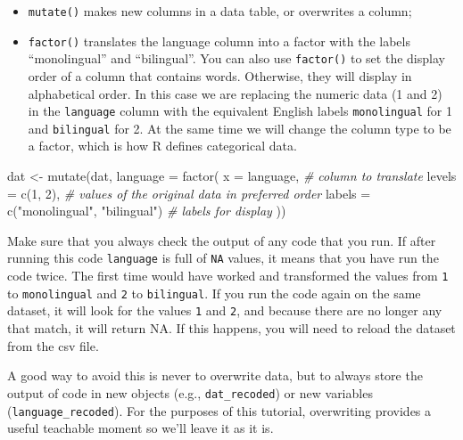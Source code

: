 \documentclass[
  english,
  doc,floatsintext]{apa6}
\newenvironment{Shaded}{\begin{snugshade}}{\end{snugshade}}
\newcommand{\AttributeTok}[1]{\textcolor[rgb]{0.77,0.63,0.00}{#1}}
\newcommand{\CommentTok}[1]{\textcolor[rgb]{0.56,0.35,0.01}{\textit{#1}}}
\newcommand{\DecValTok}[1]{\textcolor[rgb]{0.00,0.00,0.81}{#1}}
\newcommand{\FunctionTok}[1]{\textcolor[rgb]{0.00,0.00,0.00}{#1}}
\newcommand{\NormalTok}[1]{#1}
\newcommand{\OtherTok}[1]{\textcolor[rgb]{0.56,0.35,0.01}{#1}}
\newcommand{\StringTok}[1]{\textcolor[rgb]{0.31,0.60,0.02}{#1}}
\providecommand{\tightlist}{%
  \setlength{\itemsep}{0pt}\setlength{\parskip}{0pt}}
\begin{document}
\begin{itemize}
\tightlist
\item
  \texttt{mutate()} makes new columns in a data table, or overwrites a column;
\item
  \texttt{factor()} translates the language column into a factor with the labels ``monolingual'' and ``bilingual''. You can also use \texttt{factor()} to set the display order of a column that contains words. Otherwise, they will display in alphabetical order. In this case we are replacing the numeric data (1 and 2) in the \texttt{language} column with the equivalent English labels \texttt{monolingual} for 1 and \texttt{bilingual} for 2. At the same time we will change the column type to be a factor, which is how R defines categorical data.
\end{itemize}

\begin{Shaded}
\begin{Highlighting}[]
\NormalTok{dat }\OtherTok{\textless{}{-}} \FunctionTok{mutate}\NormalTok{(dat, }\AttributeTok{language =} \FunctionTok{factor}\NormalTok{(}
    \AttributeTok{x =}\NormalTok{ language, }\CommentTok{\# column to translate}
    \AttributeTok{levels =} \FunctionTok{c}\NormalTok{(}\DecValTok{1}\NormalTok{, }\DecValTok{2}\NormalTok{), }\CommentTok{\# values of the original data in preferred order}
    \AttributeTok{labels =} \FunctionTok{c}\NormalTok{(}\StringTok{"monolingual"}\NormalTok{, }\StringTok{"bilingual"}\NormalTok{) }\CommentTok{\# labels for display}
\NormalTok{  ))}
\end{Highlighting}
\end{Shaded}

Make sure that you always check the output of any code that you run. If after running this code \texttt{language} is full of \texttt{NA} values, it means that you have run the code twice. The first time would have worked and transformed the values from \texttt{1} to \texttt{monolingual} and \texttt{2} to \texttt{bilingual}. If you run the code again on the same dataset, it will look for the values \texttt{1} and \texttt{2}, and because there are no longer any that match, it will return NA. If this happens, you will need to reload the dataset from the csv file.

A good way to avoid this is never to overwrite data, but to always store the output of code in new objects (e.g., \texttt{dat\_recoded}) or new variables (\texttt{language\_recoded}). For the purposes of this tutorial, overwriting provides a useful teachable moment so we'll leave it as it is.
\end{document}
